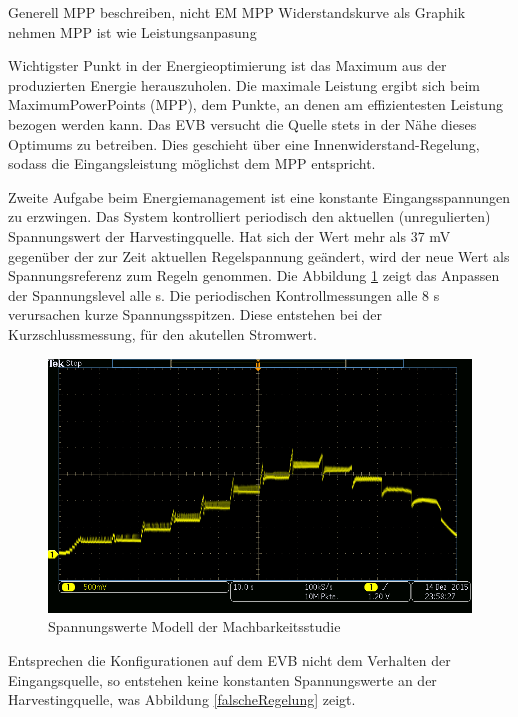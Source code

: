 Generell MPP beschreiben, nicht EM MPP
Widerstandskurve als Graphik nehmen
MPP ist wie Leistungsanpasung

Wichtigster Punkt in der Energieoptimierung ist das Maximum aus der produzierten Energie herauszuholen. Die maximale Leistung ergibt sich beim MaximumPowerPoints (MPP), dem Punkte, an denen am effizientesten Leistung bezogen werden kann. 
Das EVB versucht die Quelle stets in der Nähe dieses Optimums zu betreiben. Dies geschieht über eine Innenwiderstand-Regelung, sodass die Eingangsleistung möglichst dem MPP entspricht.

Zweite Aufgabe beim Energiemanagement ist eine konstante Eingangsspannungen zu erzwingen. Das System kontrolliert periodisch den aktuellen (unregulierten) Spannungswert der Harvestingquelle. Hat sich der Wert mehr als 37 mV gegenüber der zur Zeit aktuellen Regelspannung geändert, wird der neue Wert als Spannungsreferenz zum Regeln genommen. Die Abbildung \ref{RegelungSpannung} zeigt das Anpassen der Spannungslevel alle s. Die periodischen Kontrollmessungen alle 8 s verursachen kurze Spannungsspitzen. Diese entstehen bei der Kurzschlussmessung, für den akutellen Stromwert.


\begin{figure}    
    \includegraphics[width=15cm]{2TheoretischeGrundlagen/imag/RegelungVHRV.png}
    \caption{Spannungswerte Modell der Machbarkeitsstudie}\label{RegelungSpannung} 
\end{figure}

Entsprechen die Konfigurationen auf dem EVB nicht dem Verhalten der Eingangsquelle, so entstehen keine konstanten Spannungswerte an der Harvestingquelle, was Abbildung \ref{falscheRegelung} zeigt.

